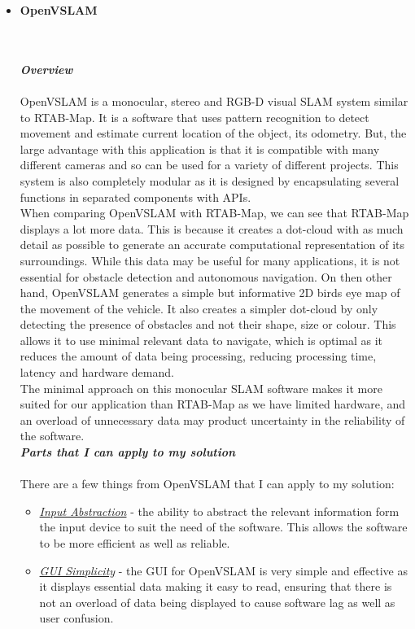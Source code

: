 \documentclass[11pt]{report}
\begin{document}
\begin{itemize}
			\item{\textbf{OpenVSLAM}}
			\\\\
				\begin{frame}{}
				\end{frame}
			\\
			\emph{\textbf{Overview}}
			\\\\
			OpenVSLAM is a monocular, stereo and RGB-D visual SLAM system similar to RTAB-Map. It is a software that uses pattern recognition to detect movement and estimate current location of the object, its odometry. But, the  large advantage with this application is that it is compatible with many different cameras and so can be used for a variety of different projects. This system is also completely modular as it is designed by encapsulating several functions in separated components with APIs. \\
	
			When comparing OpenVSLAM with RTAB-Map, we can see that RTAB-Map displays a lot more data. This is because it creates a dot-cloud with as much detail as possible to generate an accurate computational representation of its surroundings. While this data may be useful for many applications, it is not essential for obstacle detection and autonomous navigation. On then other hand, OpenVSLAM generates a simple but informative 2D birds eye map of the movement of the vehicle. It also creates a simpler dot-cloud by only detecting the presence of obstacles and not their shape, size or colour. This allows it to use minimal relevant data to navigate, which is optimal as it reduces the amount of data being processing, reducing processing time, latency and hardware demand. \\
	
			The minimal approach on this monocular SLAM software makes it more suited for our application than RTAB-Map as we have limited hardware, and an overload of unnecessary data may product uncertainty in the reliability of the software. \\
			\newpage
			\emph{\textbf{Parts that I can apply to my solution}}
			\\\\There are a few things from OpenVSLAM that I can apply to my solution:
				\begin{itemize}
					\item{\underline{\emph{Input Abstraction}}} - the ability to abstract the relevant information form the 		input device to suit the need of the software. This allows the software to be more efficient as well as 		reliable.
					\item{\underline{\emph{GUI Simplicity}}} - the GUI for OpenVSLAM is very simple and effective as it 		displays essential data making it easy to read, ensuring that there is not an overload of data being 			displayed to cause software lag as well as user confusion. 
				\end{itemize}
			\newpage
				

\end{itemize}
\end{document}
